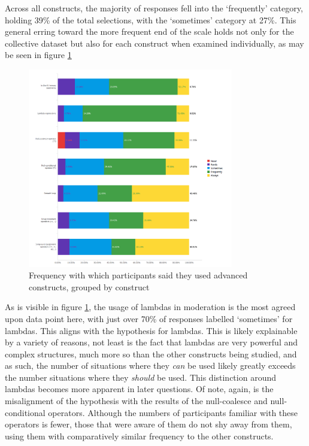 \documentclass{article}
\begin{document}
            Across all constructs, the majority of responses fell into the `frequently' category, holding 39\% of the total selections, with the `sometimes' category at 27\%. This general erring toward the more frequent end of the scale holds not only for the collective dataset but also for each construct when examined individually, as may be seen in figure \ref{fig:freqUse}

            \begin{figure}[htbp]
                \centering
                \includegraphics[width=0.8\textwidth]{freqUse}
                \caption{Frequency with which participants said they used advanced constructs, grouped by construct}
                \label{fig:freqUse}
            \end{figure}

            As is visible in figure \ref{fig:freqUse}, the usage of lambdas in moderation is the most agreed upon data point here, with just over 70\% of responses labelled `sometimes' for lambdas. This aligns with the hypothesis for lambdas. This is likely explainable by a variety of reasons, not least is the fact that lambdas are very powerful and complex structures, much more so than the other constructs being studied, and as such, the number of situations where they \emph{can} be used likely greatly exceeds the number situations where they \emph{should} be used. This distinction around lambdas becomes more apparent in later questions.
            Of note, again, is the misalignment of the hypothesis with the results of the null-coalesce and null-conditional operators. Although the numbers of participants familiar with these operators is fewer, those that were aware of them do not shy away from them, using them with comparatively similar frequency to the other constructs.
\end{document}

